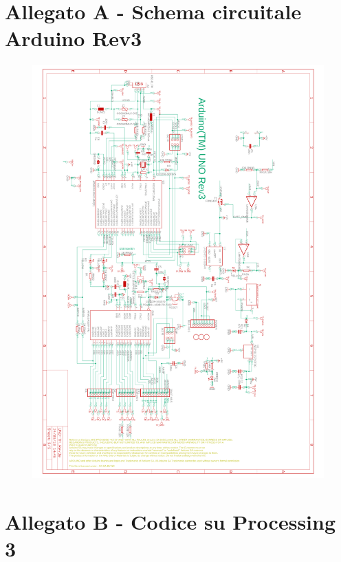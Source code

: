 \documentclass[12pt]{report}
\begin{document}
	\section*{\hypertarget{A1}{\textbf{Allegato A - Schema circuitale Arduino Rev3}}}
	\begin{figure}[H]
		\centering
		\includegraphics[scale=0.22]{UNOsch}
	\end{figure} 
	\newpage

	\section*{\hypertarget{A2}{\textbf{Allegato B - Codice su Processing 3}}}
	\lstset{basicstyle=\tiny}
	
\end{document}
